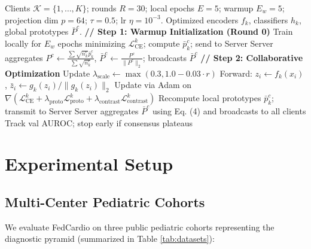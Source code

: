 \documentclass[conference]{IEEEtran}
\begin{document}
\begin{algorithm}[htbp]
\caption{CrossFedProto Federated Optimization}
\label{alg:fedcardio}
\begin{algorithmic}[1]
\REQUIRE Clients $\mathcal{K}=\{1, \dots, K\}$; rounds $R=30$; local epochs $E=5$; warmup $E_w=5$; projection dim $p=64$; $\tau=0.5$; lr $\eta=10^{-3}$.
\ENSURE Optimized encoders $f_k$, classifiers $h_k$, global prototypes $\bar{P}^c$.
\STATE \textbf{// Step 1: Warmup Initialization (Round 0)}
    \STATE Train locally for $E_w$ epochs minimizing $\mathcal{L}_{\text{CE}}^k$; compute $\bar{p}_k^c$; send to Server
\ENDFOR
\STATE Server aggregates $P^c \leftarrow \frac{\sum \sqrt{n_k^c} \bar{p}_k^c}{\sum \sqrt{n_k^c}}$, $\bar{P}^c \leftarrow \frac{P^c}{\|P^c\|_2}$; broadcasts $\bar{P}^c$
\STATE \textbf{// Step 2: Collaborative Optimization}
        \STATE Update $\lambda_{\text{scale}} \leftarrow \max(0.3, 1.0 - 0.03 \cdot r)$
                \STATE Forward: $z_i \leftarrow f_k(x_i)$, $\bar{z}_i \leftarrow g_k(z_i)/\|g_k(z_i)\|_2$
                \STATE Update via Adam on $\nabla(\mathcal{L}_{\text{CE}}^k + \lambda_{\text{proto}}\mathcal{L}_{\text{proto}}^k + \lambda_{\text{contrast}}\mathcal{L}_{\text{contrast}}^k)$
            \ENDFOR
        \ENDFOR
        \STATE Recompute local prototypes $\bar{p}_k^c$; transmit to Server
    \ENDFOR
    \STATE Server aggregates $\bar{P}^c$ using Eq. (4) and broadcasts to all clients
    \STATE Track val AUROC; stop early if consensus plateaus
\ENDFOR
\end{algorithmic}
\end{algorithm}

\section{Experimental Setup}

\subsection{Multi-Center Pediatric Cohorts}
We evaluate FedCardio on three public pediatric cohorts representing the diagnostic pyramid (summarized in Table \ref{tab:datasets}):
\end{document}
